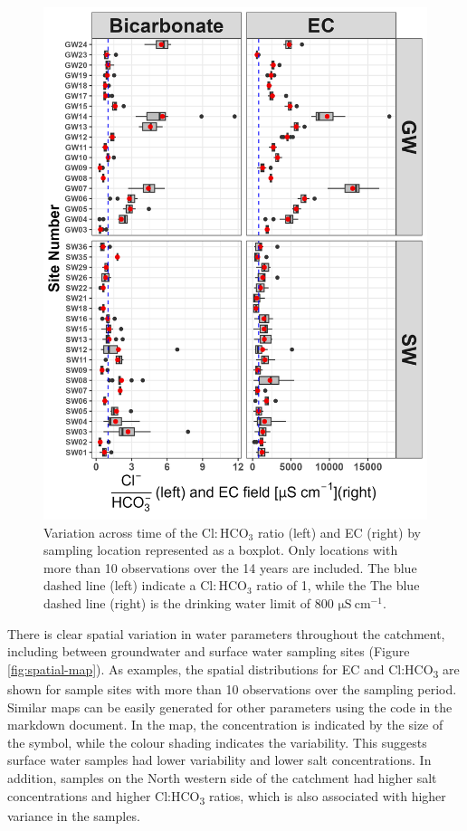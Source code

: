 \documentclass[, manuscript]{copernicus}
\begin{document}
\clearpage

\begin{figure}
\includegraphics[width=0.7\linewidth]{Figures/boxplots} \caption{Variation across time of the $\mathrm{Cl:HCO_3}$ ratio (left) and EC (right) by sampling location represented as a boxplot. Only locations with more than 10 observations over the 14 years are included. The blue dashed line (left) indicate a $\mathrm{Cl:HCO_3}$ ratio of 1, while the The blue dashed line (right) is the drinking water limit of 800 $\mathrm{\mu S~cm^{-1}}$.}\label{fig:boxplots}
\end{figure}

There is clear spatial variation in water parameters throughout the
catchment, including between groundwater and surface water sampling
sites (Figure \ref{fig:spatial-map}). As examples, the spatial
distributions for EC and Cl:HCO\textsubscript{3} are shown for sample
sites with more than 10 observations over the sampling period. Similar
maps can be easily generated for other parameters using the code in the
markdown document. In the map, the concentration is indicated by the
size of the symbol, while the colour shading indicates the variability.
This suggests surface water samples had lower variability and lower salt
concentrations. In addition, samples on the North western side of the
catchment had higher salt concentrations and higher
Cl:HCO\textsubscript{3} ratios, which is also associated with higher
variance in the samples.
\end{document}
